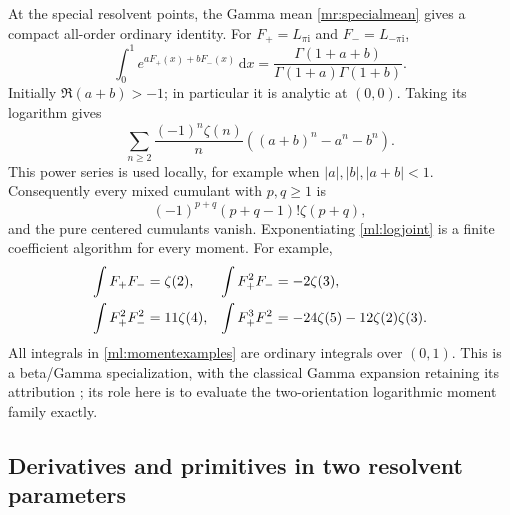 \documentclass[11pt]{article}
\numberwithin{equation}{section}
\theoremstyle{plain}
\theoremstyle{definition}
\theoremstyle{remark}
\newcommand{\ii}{\mathrm i}
\newcommand{\dd}{\,\mathrm d}
\begin{document}
At the special resolvent points, the Gamma mean \eqref{mr:specialmean}
gives a compact all-order ordinary identity. For
$F_+=L_{\pi\ii}$ and $F_-=L_{-\pi\ii}$,
\begin{equation}\label{ml:jointcumulants}
 \int_0^1e^{aF_+(x)+bF_-(x)}\dd x
       =\frac{\Gamma(1+a+b)}{\Gamma(1+a)\Gamma(1+b)}.
\end{equation}
Initially $\Re(a+b)>-1$; in particular it is analytic at $(0,0)$.
Taking its logarithm gives
\begin{equation}\label{ml:logjoint}
 \sum_{n\ge2}\frac{(-1)^n\zeta(n)}n
                     \left((a+b)^n-a^n-b^n\right).
\end{equation}
This power series is used locally, for example when
$|a|,|b|,|a+b|<1$.
Consequently every mixed cumulant with $p,q\ge1$ is
\begin{equation}\label{ml:cumulant}
              (-1)^{p+q}(p+q-1)!\zeta(p+q),
\end{equation}
and the pure centered cumulants vanish. Exponentiating
\eqref{ml:logjoint} is a finite coefficient algorithm for every moment.
For example,
\begin{align}
 \int F_+F_-&=\zeta(2),&
 \int F_+^2F_-&=-2\zeta(3),\notag\\
 \int F_+^2F_-^2&=11\zeta(4),&
 \int F_+^3F_-^2&=-24\zeta(5)-12\zeta(2)\zeta(3).
       \label{ml:momentexamples}
\end{align}
All integrals in \eqref{ml:momentexamples} are ordinary integrals over
$(0,1)$. This is a beta/Gamma specialization, with the classical Gamma
expansion retaining its attribution \cite{dlmf:gamma}; its role here is
to evaluate the two-orientation logarithmic moment family exactly.

\subsection{Derivatives and primitives in two resolvent parameters}
\end{document}
